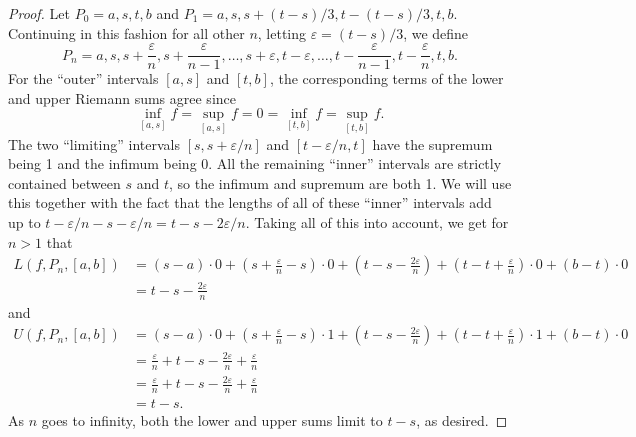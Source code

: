\documentclass[12pt]{article}
\theoremstyle{definition}
\begin{document}
\begin{proof}
	Let $P_0 = a, s, t, b$ and $P_1 = a, s, s + (t-s)/3, t - (t-s)/3, t, b$.
	Continuing in this fashion for all other $n$, letting $\varepsilon = (t-s)/3$, we define \begin{equation*}
		P_n = a, s, s + \frac{\varepsilon}{n}, s + \frac{\varepsilon}{n-1}, \dots, s + \varepsilon, t - \varepsilon, \dots, t - \frac{\varepsilon}{n-1}, t - \frac{\varepsilon}{n}, t, b.
	\end{equation*}
	For the ``outer'' intervals $[a, s]$ and $[t, b]$, the corresponding terms of the lower and upper Riemann sums agree since \begin{equation*}
		\inf_{[a, s]} f = \sup_{[a, s]} f = 0 = \inf_{[t, b]}f = \sup_{[t, b]}f.
	\end{equation*}
	The two ``limiting'' intervals $[s, s + \varepsilon/n]$ and $[t - \varepsilon/n, t]$ have the supremum being 1 and the infimum being 0.
	All the remaining ``inner'' intervals are strictly contained between $s$ and $t$, so the infimum and supremum are both 1.
	We will use this together with the fact that the lengths of all of these ``inner'' intervals add up to $t - \varepsilon/n - s - \varepsilon/n = t - s - 2\varepsilon/n$.
	Taking all of this into account, we get for $n > 1$ that \begin{align*}
		L(f, P_n, [a, b]) & = (s - a) \cdot 0 + \left(s + \frac{\varepsilon}{n} - s\right) \cdot 0 + (t - s - \frac{2\varepsilon}{n}) + \left( t - t + \frac{\varepsilon}{n} \right)\cdot 0 + (b - t) \cdot 0 \\
		                  & = t - s - \frac{2\varepsilon}{n}
	\end{align*}
	and \begin{align*}
		U(f, P_n, [a, b]) & = (s - a) \cdot 0 + \left(s + \frac{\varepsilon}{n} - s\right) \cdot 1 + (t - s - \frac{2\varepsilon}{n}) + \left( t - t + \frac{\varepsilon}{n} \right)\cdot 1 + (b - t) \cdot 0 \\
		                  & = \frac{\varepsilon}{n} + t - s - \frac{2\varepsilon}{n} + \frac{\varepsilon}{n}                                                                                                  \\
		                  & = \frac{\varepsilon}{n} + t - s - \frac{2\varepsilon}{n} + \frac{\varepsilon}{n}                                                                                                  \\
		                  & = t - s.
	\end{align*}
	As $n$ goes to infinity, both the lower and upper sums limit to $t - s$, as desired.
\end{proof}
\end{document}
